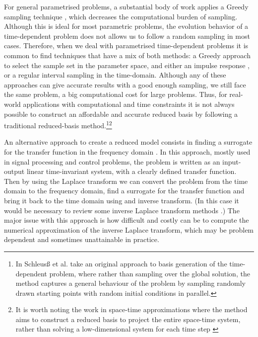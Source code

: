 For general parametrised problems, a substantial body of work applies a Greedy sampling technique \cite{bui-thanh_model_2008,buffa_priori_2012,devore_greedy_2013}, which decreases the computational burden of sampling. Although this is ideal for most parametric problems, the evolution behavior of a time-dependent problem does not allows us to follow a random sampling in most cases. Therefore, when we deal with parametrised time-dependent problems it is common to find techniques that have a mix of both methods: a Greedy approach to select the sample set in the parameter space, and either an impulse response \cite{lall_subspace_2002,grepl_posteriori_2005,haasdonk_reduced_2008}, or a regular interval sampling \cite{rovas_reduced-basis_2006,nguyen_reduced_2009,grepl_certified_2012,guo_data-driven_2019,baurChapterComparisonMethods2017} in the time-domain. Although any of these approaches can give accurate results with a good enough sampling, we still face the same problem, a big computational cost for large problems. Thus, for real-world applications with computational and time constraints it is not always possible to construct an affordable and accurate reduced basis by following a traditional reduced-basis method.\footnote{In \cite{schleus_randomized_2022} Schleusß et al. take an original approach to basis generation of the time-dependent problem, where rather than sampling over the global solution, the method captures a general behaviour of the problem by sampling randomly drawn starting points with random initial conditions in parallel.}\footnote{It is worth noting the work in space-time approximations where the method aims to construct a reduced basis to project the entire space-time system, rather than solving a low-dimensional system for each time step \cite{yano_space-time_2014,Choi2017}}

An alternative approach to create a reduced model %
consists in finding a surrogate for the transfer function in the frequency domain \cite{huynh_laplace_2011,Bigoni2020a,Bhouri2020,baurChapterComparisonMethods2017}. In this approach, mostly used in signal processing and control problems, the problem is written as an input-output linear time-invariant system, with a clearly defined transfer function. Then by using the Laplace transform we can convert the problem from the time domain to the frequency domain, find a surrogate for the transfer function and bring it back to the time domain using and inverse transform. (In this case it would be necessary to review some inverse Laplace transform methods \cite{kuhlman_review_2013}.) The major issue with this approach is how difficult and costly can be to compute the numerical approximation of the inverse Laplace transform, which may be problem dependent and sometimes unattainable in practice.

